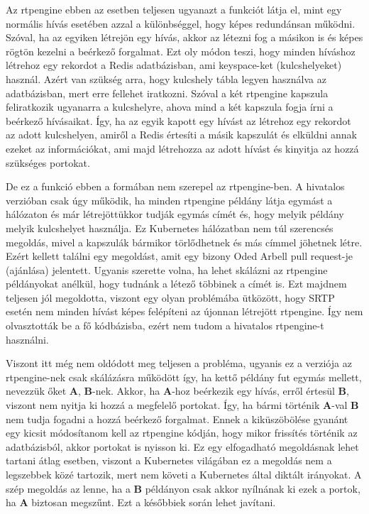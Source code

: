 Az rtpengine ebben az esetben teljesen ugyanazt a funkciót látja el, mint egy normális hívás
esetében azzal a különbséggel, hogy képes redundánsan működni. Szóval, ha az egyiken létrejön
egy hívás, akkor az létezni fog a másikon is és képes rögtön kezelni a beérkező forgalmat. Ezt
oly módon teszi, hogy minden híváshoz létrehoz egy rekordot a Redis adatbázisban, ami 
keyspace-ket (kulcshelyeket) használ. Azért van szükség arra, hogy kulcshely tábla legyen
használva az adatbázisban, mert erre fellehet iratkozni. Szóval a két rtpengine kapszula
feliratkozik ugyanarra a kulcshelyre, ahova mind a két kapszula fogja írni a beérkező hívásaikat.
Így, ha az egyik kapott egy hívást az létrehoz egy rekordot az adott kulcshelyen, amiről a 
Redis értesíti a másik kapszulát és elküldni annak ezeket az információkat, ami majd létrehozza
az adott hívást és kinyitja az hozzá szükséges portokat.  

De ez a funkció ebben a formában nem szerepel az rtpengine-ben. A hivatalos verzióban csak úgy 
működik, ha minden rtpengine példány látja egymást a hálózaton és már létrejöttükkor tudják
egymás címét és, hogy melyik példány melyik kulcshelyet használja. Ez Kubernetes hálózatban
nem túl szerencsés megoldás, mivel a kapszulák bármikor törlődhetnek és más címmel jöhetnek 
létre. Ezért kellett találni egy megoldást, amit egy bizony Oded Arbell pull request-je (ajánlása)
jelentett. Ugyanis szerette volna, ha lehet skálázni az rtpengine példányokat anélkül, hogy 
tudnánk a létező többinek a címét is. Ezt majdnem teljesen jól megoldotta, viszont egy olyan 
problémába ütközött, hogy SRTP esetén nem minden hívást képes felépíteni az újonnan létrejött
rtpengine. Így nem olvasztották be a fő kódbázisba, ezért nem tudom a hivatalos rtpengine-t használni.

Viszont itt még nem oldódott meg teljesen a probléma, ugyanis ez a verziója az rtpengine-nek csak
skálázásra működött így, ha kettő példány fut egymás mellett, nevezzük őket \textbf{A}, 
\textbf{B}-nek. Akkor, ha \textbf{A}-hoz beérkezik egy hívás, erről értesül \textbf{B}, viszont nem
nyitja ki hozzá a megfelelő portokat. Így, ha bármi történik \textbf{A}-val \textbf{B} nem tudja
fogadni a hozzá beérkező forgalmat. Ennek a kiküszöbölése gyanánt egy kicsit módosítanom 
kell az rtpengine kódján, hogy mikor frissítés történik az adatbázisból, akkor portokat is nyisson ki.
Ez egy elfogadható megoldásnak lehet tartani átlag esetben, viszont a Kubernetes világában
ez a megoldás nem a legszebbek közé tartozik, mert nem követi a Kubernetes által diktált
irányokat. A szép megoldás az lenne, ha a \textbf{B} példányon csak akkor nyílnának ki ezek a 
portok, ha \textbf{A} biztosan megszűnt. Ezt a későbbiek során lehet javítani. \\

